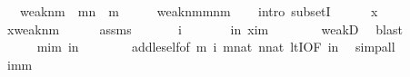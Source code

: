 \begin{isabellebody}
\ \ \ {\isachardoublequoteopen}weak{\isacharparenleft}{\kern0pt}n{\isacharcomma}{\kern0pt}m{\isacharparenright}{\kern0pt}\ {\isacharequal}{\kern0pt}\ {\isacharparenleft}{\kern0pt}m{\isacharhash}{\kern0pt}{\isacharplus}{\kern0pt}n{\isacharparenright}{\kern0pt}\ {\isacharminus}{\kern0pt}\ m{\isachardoublequoteclose}\isanewline
%
\isadelimproof
%
\endisadelimproof
%
\isatagproof
{}\isamarkupfalse%
\ {\isacharminus}{\kern0pt}\isanewline
\ \ \isamarkupfalse%
\ {\isachardoublequoteopen}weak{\isacharparenleft}{\kern0pt}n{\isacharcomma}{\kern0pt}m{\isacharparenright}{\kern0pt}{\isasymsubseteq}{\isacharparenleft}{\kern0pt}m{\isacharhash}{\kern0pt}{\isacharplus}{\kern0pt}n{\isacharparenright}{\kern0pt}{\isacharminus}{\kern0pt}m{\isachardoublequoteclose}\ \isanewline
\ \ \isamarkupfalse%
{\isacharparenleft}{\kern0pt}intro\ subsetI{\isacharparenright}{\kern0pt}\isanewline
\ \ \ \ \isamarkupfalse%
\ x\isanewline
\ \ \ \ \isamarkupfalse%
\ {\isachardoublequoteopen}x{\isasymin}weak{\isacharparenleft}{\kern0pt}n{\isacharcomma}{\kern0pt}m{\isacharparenright}{\kern0pt}{\isachardoublequoteclose}\isanewline
\ \ \ \ \isamarkupfalse%
\ assms\ \isanewline
\ \ \ \ \isamarkupfalse%
\ i\ \isanewline
\ \ \ \ \ \ {\isachardoublequoteopen}i{\isasymin}n{\isachardoublequoteclose}\ {\isachardoublequoteopen}x{\isacharequal}{\kern0pt}i{\isacharhash}{\kern0pt}{\isacharplus}{\kern0pt}m{\isachardoublequoteclose}\isanewline
\ \ \ \ \ \ \isamarkupfalse%
\ weakD\ \isamarkupfalse%
\ blast\isanewline
\ \ \ \ \isamarkupfalse%
\isanewline
\ \ \ \ \isamarkupfalse%
\ {\isachardoublequoteopen}m{\isasymle}i{\isacharhash}{\kern0pt}{\isacharplus}{\kern0pt}m{\isachardoublequoteclose}\ {\isachardoublequoteopen}i{\isacharless}{\kern0pt}n{\isachardoublequoteclose}\isanewline
\ \ \ \ \ \ \isamarkupfalse%
\ add{\isacharunderscore}{\kern0pt}le{\isacharunderscore}{\kern0pt}self{}{\isacharbrackleft}{\kern0pt}of\ m\ i{\isacharbrackright}{\kern0pt}\ {\isacartoucheopen}m{\isasymin}nat{\isacartoucheclose}\ {\isacartoucheopen}n{\isasymin}nat{\isacartoucheclose}\ ltI{\isacharbrackleft}{\kern0pt}OF\ {\isacartoucheopen}i{\isasymin}n{\isacartoucheclose}{\isacharbrackright}{\kern0pt}\ \isamarkupfalse%
\ simp{\isacharunderscore}{\kern0pt}all\isanewline
\ \ \ \ \isamarkupfalse%
\isanewline
\ \ \ \ \isamarkupfalse%
\ {\isachardoublequoteopen}{\isasymnot}i{\isacharhash}{\kern0pt}{\isacharplus}{\kern0pt}m{\isacharless}{\kern0pt}m{\isachardoublequoteclose}\isanewline

\end{isabellebody}
